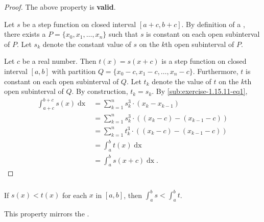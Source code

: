 \documentclass{report}
\begin{document}
  \begin{proof}
    The above property is \textbf{valid}.

    \vspace{6pt}

    Let $s$ be a step function on closed interval $[a + c, b + c]$.
    By definition of a , there exists a
       $P = \{x_0, x_1, \ldots, x_n\}$ such that $s$ is
      constant on each open subinterval of $P$.
    Let $s_k$ denote the constant value of $s$ on the $k$th open subinterval of
      $P$.

    Let $c$ be a real number.
    Then $t(x) = s(x + c)$ is a step function on closed interval $[a, b]$ with
      partition $Q = \{x_0 - c, x_1 - c, \ldots, x_n - c\}$.
    Furthermore, $t$ is constant on each open subinterval of $Q$.
    Let $t_k$ denote the value of $t$ on the $k$th open subinterval of $Q$.
    By construction, $t_k = s_k$.
    By \eqref{sub:exercise-1.15.11-eq1},
      \begin{align*}
        \int_{a+c}^{b+c} s(x) \mathop{dx}
          & = \sum_{k=1}^n s_k^3 \cdot (x_k - x_{k-1}) \\
          & = \sum_{k=1}^n s_k^3 \cdot ((x_k - c) - (x_{k-1} - c)) \\
          & = \sum_{k=1}^n t_k^3 \cdot ((x_k - c) - (x_{k-1} - c)) \\
          & = \int_a^b t(x) \mathop{dx} \\
          & = \int_a^b s(x + c) \mathop{dx}.
      \end{align*}
  \end{proof}

\subsubsection{}%

  If $s(x) < t(x)$ for each $x$ in $[a, b]$, then $\int_a^b s < \int_a^b t$.

  \begin{note}
    This property mirrors the .
  \end{note}
\end{document}
